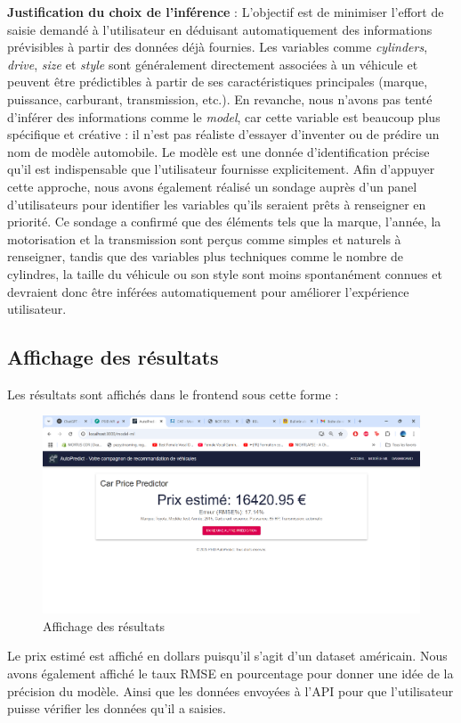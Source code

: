 \documentclass[12pt]{report}
\begin{document}
\textbf{Justification du choix de l'inférence} :  
L'objectif est de minimiser l'effort de saisie demandé à l'utilisateur en déduisant automatiquement des informations prévisibles à partir des données déjà fournies. Les variables comme \textit{cylinders}, \textit{drive}, \textit{size} et \textit{style} sont généralement directement associées à un véhicule et peuvent être prédictibles à partir de ses caractéristiques principales (marque, puissance, carburant, transmission, etc.).  
En revanche, nous n'avons pas tenté d'inférer des informations comme le \textit{model}, car cette variable est beaucoup plus spécifique et créative : il n'est pas réaliste d'essayer d'inventer ou de prédire un nom de modèle automobile. Le modèle est une donnée d'identification précise qu'il est indispensable que l'utilisateur fournisse explicitement.  
Afin d'appuyer cette approche, nous avons également réalisé un sondage auprès d'un panel d'utilisateurs pour identifier les variables qu'ils seraient prêts à renseigner en priorité. Ce sondage a confirmé que des éléments tels que la marque, l'année, la motorisation et la transmission sont perçus comme simples et naturels à renseigner, tandis que des variables plus techniques comme le nombre de cylindres, la taille du véhicule ou son style sont moins spontanément connues et devraient donc être inférées automatiquement pour améliorer l'expérience utilisateur.

\subsection{Affichage des résultats}

Les résultats sont affichés dans le frontend sous cette forme : 

\begin{figure}[H]
    \centering
    \includegraphics[width=1\textwidth]{resultats.png}
    \caption{Affichage des résultats}
    \label{fig:resultats}
\end{figure}
Le prix estimé est affiché en dollars puisqu'il s'agit d'un dataset américain. Nous avons également affiché le taux RMSE en pourcentage pour donner une idée de la précision du modèle. Ainsi que les données envoyées à l'API pour que l'utilisateur puisse vérifier les données qu'il a saisies.
\end{document}
